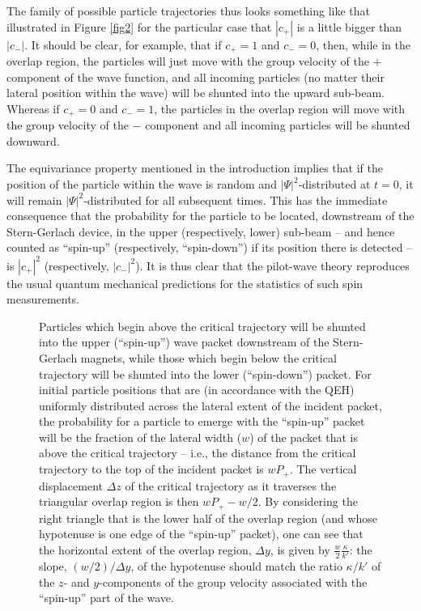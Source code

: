 \documentclass[aps,prc,onecolumn,letterpaper,floatfix,12pt]{revtex4}
\begin{document}
The family of possible particle trajectories thus looks something like
that illustrated in Figure \ref{fig2} for the particular case that
$|c_+|$ is a little bigger than $|c_-|$.  It should be clear, for
example, that if $c_+ = 1$ and $c_- = 0$, then, while in the overlap
region,  the particles will just
move with the group velocity of the $+$ component of the wave
function, and all incoming particles (no matter their lateral
position within the wave) will be shunted into the upward sub-beam.
Whereas if $c_+ = 0$ and $c_- = 1$, the particles in the overlap
region will move with the group velocity of the $-$ component and all
incoming particles will be shunted downward.  

The equivariance property mentioned in the introduction implies that
if the position of the particle within the wave is random and
$|\Psi|^2$-distributed at $t=0$, it will remain $|\Psi|^2$-distributed
for all subsequent times.  This has the immediate consequence that the
probability for the particle to be located, downstream of the
Stern-Gerlach device, in the upper (respectively, lower) sub-beam --
and hence counted as ``spin-up'' (respectively, ``spin-down'') if its
position there is detected -- is $|c_+|^2$ (respectively, $|c_-|^2$).
It is thus clear that the pilot-wave theory reproduces the usual
quantum mechanical predictions for the statistics of such spin
measurements.  




\begin{figure}[t]
\begin{center}
\scalebox{1.0}{

}
\caption{
Particles which begin above the critical trajectory will be shunted
into the upper (``spin-up'') wave packet downstream of the
Stern-Gerlach magnets, while those which begin below the critical
trajectory will be shunted into the lower (``spin-down'') packet.  For
initial particle positions that are (in accordance with the QEH) 
uniformly distributed across the
lateral extent of the incident packet, the probability for a particle to emerge
with the ``spin-up'' packet will be the fraction of the lateral
width ($w$) of the packet that is above the critical trajectory -- i.e., the
distance from the critical trajectory to the top of the incident
packet is $w P_+$.  The vertical displacement $\Delta z$ of the critical
trajectory  as it traverses the triangular overlap region is then
$wP_+ - w/2$.  By considering the right triangle that is the lower
half of the overlap region (and whose hypotenuse is one edge of the
``spin-up'' packet), one can see that the horizontal extent of the
overlap region, $\Delta y$, is given by $\frac{w}{2} \frac{\kappa}{k'}$:
the slope, $(w/2)/\Delta y$, of the hypotenuse should match the
ratio $\kappa / k'$ of the $z$- and $y$-components of the group
velocity associated with the  ``spin-up'' part of the wave. 
\label{fig3}
}
\end{center}
\end{figure}
\end{document}
